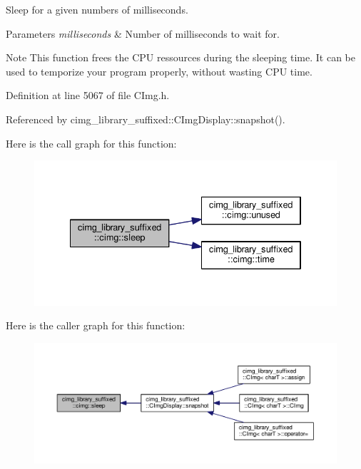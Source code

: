 Sleep for a given numbers of milliseconds. 


\begin{DoxyParams}{Parameters}
{\em milliseconds} & Number of milliseconds to wait for. \\
\hline
\end{DoxyParams}
\begin{DoxyNote}{Note}
This function frees the C\+PU ressources during the sleeping time. It can be used to temporize your program properly, without wasting C\+PU time. 
\end{DoxyNote}


Definition at line 5067 of file C\+Img.\+h.



Referenced by cimg\+\_\+library\+\_\+suffixed\+::\+C\+Img\+Display\+::snapshot().

Here is the call graph for this function\+:
\nopagebreak
\begin{figure}[H]
\begin{center}
\leavevmode
\includegraphics[width=334pt]{d4/d9b/namespacecimg__library__suffixed_1_1cimg_aa2bf8fb0d97c122cbc52e1f2e167e8a6_cgraph}
\end{center}
\end{figure}
Here is the caller graph for this function\+:
\nopagebreak
\begin{figure}[H]
\begin{center}
\leavevmode
\includegraphics[width=350pt]{d4/d9b/namespacecimg__library__suffixed_1_1cimg_aa2bf8fb0d97c122cbc52e1f2e167e8a6_icgraph}
\end{center}
\end{figure}
\mbox{\label{namespacecimg__library__suffixed_1_1cimg_a61e1cd854cf93fdf3f6d06525e1590c5}} 
